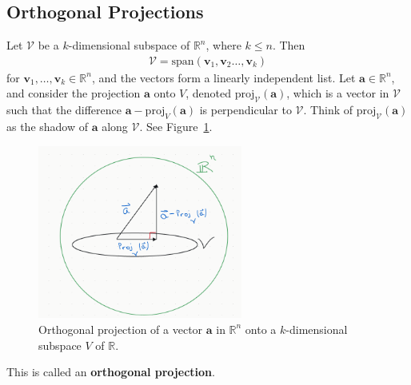 \documentclass[12pt, a4paper]{article}
\theoremstyle{definition}
\begin{document}
	\subsection*{Orthogonal Projections}
	Let $\mathcal{V}$ be a $k$-dimensional subspace of $\mathbb{R}^n$, where $k\leq n$.
	Then
	\begin{align*}
	\mathcal{V}=\text{span}(\mathbf{v}_1,\mathbf{v}_2\ldots,\mathbf{v}_k)
	\end{align*}
	for $\mathbf{v}_1,\ldots,\mathbf{v}_k\in\mathbb{R}^n$, and the vectors form a linearly
	independent list. Let $\mathbf{a}\in\mathbb{R}^n$, and consider the projection
	$\mathbf{a}$ onto $V$, denoted $\text{proj}_\mathcal{V}(\mathbf{a})$, which is a vector
	in $\mathcal{V}$ such that the difference $\mathbf{a} - \text{proj}_V(\mathbf{a})$ is
	perpendicular to $\mathcal{V}$. Think of $\text{proj}_{\mathcal{V}}(\mathbf{a})$ as the
	shadow of $\mathbf{a}$ along $\mathcal{V}$. See Figure~\ref{fig:orthogonal-projection}.
	\begin{figure}
		\centering
		\includegraphics[width=0.6\textwidth]{orthogonal-projection}
		\caption{Orthogonal projection of a vector $\mathbf{a}$ in $\mathbb{R}^n$ onto
		a $k$-dimensional subspace $V$ of $\mathbb{R}$.}
		\label{fig:orthogonal-projection}
	\end{figure}
	This is called an \textbf{orthogonal projection}.
	
\end{document}
